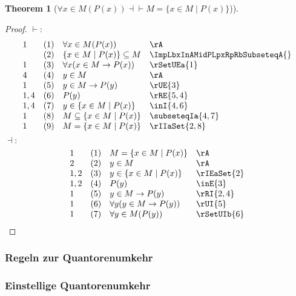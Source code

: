 \documentclass{book}
\theoremstyle{plain}
\newtheorem{theorem}{Theorem}
\theoremstyle{remark}
\theoremstyle{definition}
\begin{document}
\label{FaxInMLpPLpxRpRpEqvMEqualsLbxInMMidPLpxRpRb}
\begin{theorem}[\(\forall x \in M(P(x)) \dashv\vdash M = \{x \in M \mid P(x)\}\))]
\end{theorem}
\begin{proof}
	\(\vdash:\)
	\[
	\begin{array}{llll}
		1   & (1) & \forall x \in M(P(x)) & \rA \\
		& (2) & \{x\in M\mid P(x)\}\subseteq M & \ImpLbxInAMidPLpxRpRbSubseteqA{} \\		
		1   & (3) & \forall x(x\in M\rightarrow P(x)) & \rSetUEa{1} \\
		4   & (4) & y\in M & \rA \\
		1   & (5) & y\in M\rightarrow P(y) & \rUE{3} \\
		1,4 & (6) & P(y) & \rRE{5,4} \\
		1,4 & (7) & y\in\{x\in M\mid P(x)\}  & \inI{4,6} \\
		1   & (8) & M\subseteq \{x\in M\mid P(x)\}  & \subseteqIa{4,7} \\
		1   & (9) & M=\{x\in M\mid P(x)\}  & \rIIaSet{2,8} \\
	\end{array}
	\]
	\(\dashv:\)
	\[
	\begin{array}{llll}
		1   & (1) & M = \{x \in M \mid P(x)\} & \rA \\
		2   & (2) & y\in M  & \rA \\
		1,2 & (3) & y\in \{x \in M \mid P(x)\}  & \rIEaSet{2} \\
		1,2 & (4) & P(y)  & \inE{3} \\
		1   & (5) & y\in M\rightarrow P(y)  & \rRI{2,4} \\
		1   & (6) & \forall y(y\in M\rightarrow P(y))  & \rUI{5} \\
		1   & (7) & \forall y\in M(P(y))  & \rSetUIb{6} \\		
	\end{array}
	\]
\end{proof}

\subsubsection{Regeln zur Quantorenumkehr}
\subsubsection{Einstellige Quantorenumkehr}
\end{document}
